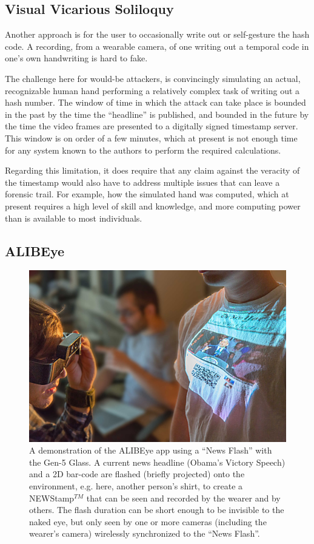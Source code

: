 \subsection{Visual Vicarious Soliloquy}
Another approach is for the user to occasionally write out or self-gesture
the hash code.  A recording, from a wearable camera, of
one writing out a temporal code in one's own handwriting
is hard to fake.

The challenge here for would-be attackers, is convincingly simulating
an actual, recognizable human hand performing a relatively complex
task of writing out a hash number.  The window of time in which the
attack can take place is bounded in the past by the time the
``headline'' is published, and bounded in the future by the time the
video frames are presented to a digitally signed timestamp server.
This window is on order of a few minutes, which at present is not
enough time for any system known to the authors to perform the
required calculations.

Regarding this limitation, it does require that any claim against the
veracity of the timestamp would also have to address multiple issues
that can leave a forensic trail.  For example, how the simulated hand
was computed, which at present requires a high level of skill and
knowledge, and more computing power than is available to most
individuals.

\subsection{ALIBEye}
\begin{figure}
  \center
  \includegraphics[width=5.2in]{ch6/figs/NYTimes_alibi_veillance_lowres.jpg}
  \caption{A demonstration of the ALIBEye app using a ``News Flash''
           with the Gen-5 Glass.
           A current news headline (Obama's Victory Speech) and a
           2D bar-code are flashed (briefly projected) onto the environment,
           e.g. here, another person's shirt, to create a NEWStamp$^{TM}$
           that can be seen and recorded
           by the wearer and by others.  The flash duration can be short
           enough to be invisible to the naked eye, but only seen by
           one or more cameras (including the wearer's camera)
           wirelessly synchronized to the ``News Flash''.}
  \label{fig:proj_ray}
\end{figure}

